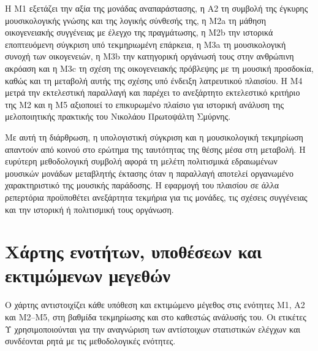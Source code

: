 \documentclass[11pt,a4paper]{article}
\begin{document}
Η M1 εξετάζει την αξία της μονάδας αναπαράστασης, η Α2 τη συμβολή της έγκυρης μουσικολογικής γνώσης και της λογικής σύνθεσής της, η M2a τη μάθηση οικογενειακής συγγένειας με έλεγχο της πραγμάτωσης, η M2b την ιστορικά εποπτευόμενη σύγκριση υπό τεκμηριωμένη επάρκεια, η M3a τη μουσικολογική συνοχή των οικογενειών, η M3b την κατηγορική οργάνωσή τους στην ανθρώπινη ακρόαση και η M3c τη σχέση της οικογενειακής πρόβλεψης με τη μουσική προσδοκία, καθώς και τη μεταβολή αυτής της σχέσης υπό ένδειξη λατρευτικού πλαισίου. Η M4 μετρά την εκτελεστική παραλλαγή και παρέχει το ανεξάρτητο εκτελεστικό κριτήριο της M2 και η M5 αξιοποιεί το επικυρωμένο πλαίσιο για ιστορική ανάλυση της μελοποιητικής πρακτικής του Νικολάου Πρωτοψάλτη Σμύρνης.

Με αυτή τη διάρθρωση, η υπολογιστική σύγκριση και η μουσικολογική τεκμηρίωση απαντούν από κοινού στο ερώτημα της ταυτότητας της θέσης μέσα στη μεταβολή. Η ευρύτερη μεθοδολογική συμβολή αφορά τη μελέτη πολιτισμικά εδραιωμένων μουσικών μονάδων μεταβλητής έκτασης όταν η παραλλαγή αποτελεί οργανωμένο χαρακτηριστικό της μουσικής παράδοσης. Η εφαρμογή του πλαισίου σε άλλα ρεπερτόρια προϋποθέτει ανεξάρτητα τεκμήρια για τις μονάδες, τις σχέσεις συγγένειας και την ιστορική ή πολιτισμική τους οργάνωση.

\appendix
\newcommand{\LatinAppendixLetter}[1]{\ifcase#1\or A\or B\or C\or D\or E\or F\or G\or H\or I\or J\or K\or L\fi}
\renewcommand{\thesection}{\LatinAppendixLetter{\value{section}}}
\renewcommand{\thesubsection}{\thesection.\arabic{subsection}}
\renewcommand{\thesubsubsection}{\thesubsection.\arabic{subsubsection}}

\section{Χάρτης ενοτήτων, υποθέσεων και εκτιμώμενων μεγεθών}\label{app:estimand-map}

Ο χάρτης αντιστοιχίζει κάθε υπόθεση και εκτιμώμενο μέγεθος στις ενότητες Μ1, Α2 και Μ2--Μ5, στη βαθμίδα τεκμηρίωσης και στο καθεστώς ανάλυσής του. Οι ετικέτες Υ χρησιμοποιούνται για την αναγνώριση των αντίστοιχων στατιστικών ελέγχων και συνδέονται ρητά με τις μεθοδολογικές ενότητες.
\end{document}
